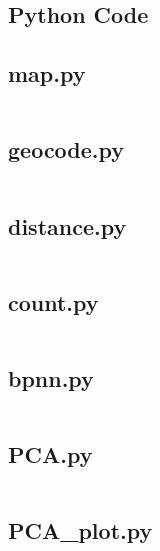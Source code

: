\documentclass{mcmthesis}
\begin{document}
\begin{appendices}

\section{Python Code}

\subsection{map.py}\label{code:map}
\inputminted{python}{../src/map.py}

\subsection{geocode.py}\label{code:geocode}
\inputminted{python}{../src/geocode.py}

\subsection{distance.py}\label{code:distance}
\inputminted{python}{../src/distance.py}

\subsection{count.py} \label{code:count}
\inputminted{python}{../src/count.py}

\subsection{bpnn.py} \label{code:bpnn}
\inputminted{python}{../src/bpnn.py}

\subsection{PCA.py} \label{code:PCA}
\inputminted{python}{../src/PCA.py}

\subsection{PCA\_plot.py} \label{code:PCA_plot}
\inputminted{python}{../src/PCA_plot.py}


\end{appendices}
\end{document}
